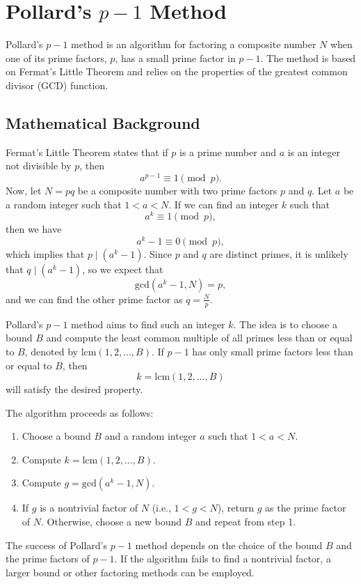\documentclass[12pt,openany]{book}
\theoremstyle{definition}
\begin{document}
	\section*{Pollard's $p-1$ Method}
	Pollard's $p-1$ method is an algorithm for factoring a composite number $N$ when one of its prime factors, $p$, has a small prime factor in $p-1$. The method is based on Fermat's Little Theorem and relies on the properties of the greatest common divisor (GCD) function.
	
	\subsection*{Mathematical Background}
	Fermat's Little Theorem states that if $p$ is a prime number and $a$ is an integer not divisible by $p$, then
	\[
	a^{p-1} \equiv 1 \pmod{p}.
	\]
	Now, let $N = pq$ be a composite number with two prime factors $p$ and $q$. Let $a$ be a random integer such that $1 < a < N$. If we can find an integer $k$ such that
	\[
	a^k \equiv 1 \pmod{p},
	\]
	then we have
	\[
	a^k - 1 \equiv 0 \pmod{p},
	\]
	which implies that $p \mid (a^k - 1)$. Since $p$ and $q$ are distinct primes, it is unlikely that $q \mid (a^k - 1)$, so we expect that
	\[
	\text{gcd}(a^k - 1, N) = p,
	\]
	and we can find the other prime factor as $q = \frac{N}{p}$.
	
	Pollard's $p-1$ method aims to find such an integer $k$. The idea is to choose a bound $B$ and compute the least common multiple of all primes less than or equal to $B$, denoted by $\text{lcm}(1, 2, \ldots, B)$. If $p-1$ has only small prime factors less than or equal to $B$, then
	\[
	k = \text{lcm}(1, 2, \ldots, B)
	\]
	will satisfy the desired property.
	
	The algorithm proceeds as follows:
	
	\begin{enumerate}
		\item Choose a bound $B$ and a random integer $a$ such that $1 < a < N$.
		\item Compute $k = \text{lcm}(1, 2, \ldots, B)$.
		\item Compute $g = \text{gcd}(a^k - 1, N)$.
		\item If $g$ is a nontrivial factor of $N$ (i.e., $1 < g < N$), return $g$ as the prime factor of $N$. Otherwise, choose a new bound $B$ and repeat from step 1.
	\end{enumerate}
	
	The success of Pollard's $p-1$ method depends on the choice of the bound $B$ and the prime factors of $p-1$. If the algorithm fails to find a nontrivial factor, a larger bound or other factoring methods can be employed.
	
\end{document}
